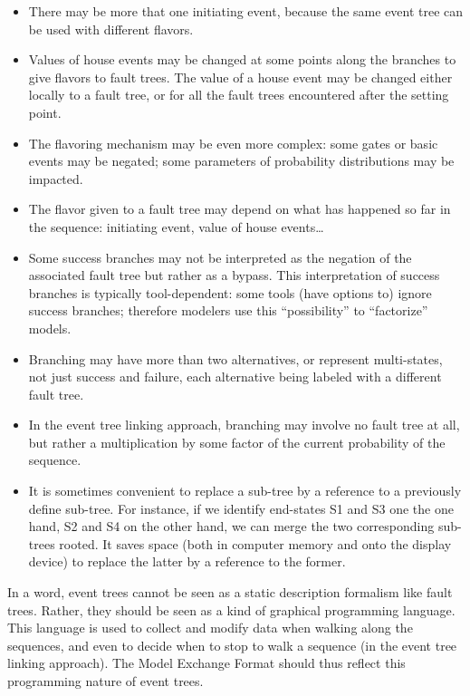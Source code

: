 \documentclass[11pt]{article}
\begin{document}
\begin{itemize}
\item There may be more that one initiating event, because the same event
tree can be used with different flavors.

\item Values of house events may be changed at some points along the
branches to give flavors to fault trees. The value of a house event
may be changed either locally to a fault tree, or for all the fault
trees encountered after the setting point.

\item The flavoring mechanism may be even more complex: some gates or basic
events may be negated; some parameters of probability distributions
may be impacted.

\item The flavor given to a fault tree may depend on what has happened so
far in the sequence: initiating event, value of house events\ldots{}

\item Some success branches may not be interpreted as the negation of the
associated fault tree but rather as a bypass. This interpretation of
success branches is typically tool-dependent: some tools (have
options to) ignore success branches; therefore modelers use this
``possibility'' to ``factorize'' models.

\item Branching may have more than two alternatives, or represent
multi-states, not just success and failure, each alternative being
labeled with a different fault tree.

\item In the event tree linking approach, branching may involve no fault
tree at all, but rather a multiplication by some factor of the
current probability of the sequence.

\item It is sometimes convenient to replace a sub-tree by a reference to a
previously define sub-tree. For instance, if we identify end-states
S1 and S3 one the one hand, S2 and S4 on the other hand, we can merge
the two corresponding sub-trees rooted. It saves space (both in
computer memory and onto the display device) to replace the latter by
a reference to the former.
\end{itemize}

In a word, event trees cannot be seen as a static description formalism
like fault trees. Rather, they should be seen as a kind of graphical
programming language. This language is used to collect and modify data
when walking along the sequences, and even to decide when to stop to
walk a sequence (in the event tree linking approach). The Model Exchange
Format should thus reflect this programming nature of event trees.
\end{document}
